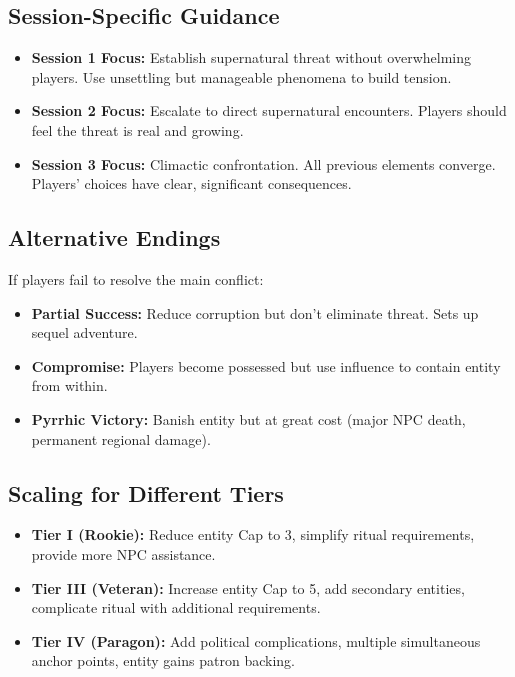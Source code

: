 \documentclass[11pt]{article}
\begin{document}
\subsection*{Session-Specific Guidance}
\begin{itemize}
    \item \textbf{Session 1 Focus:} Establish supernatural threat without overwhelming players. Use unsettling but manageable phenomena to build tension.
    \item \textbf{Session 2 Focus:} Escalate to direct supernatural encounters. Players should feel the threat is real and growing.
    \item \textbf{Session 3 Focus:} Climactic confrontation. All previous elements converge. Players' choices have clear, significant consequences.
\end{itemize}

\subsection*{Alternative Endings}
If players fail to resolve the main conflict:
\begin{itemize}
    \item \textbf{Partial Success:} Reduce corruption but don't eliminate threat. Sets up sequel adventure.
    \item \textbf{Compromise:} Players become possessed but use influence to contain entity from within.
    \item \textbf{Pyrrhic Victory:} Banish entity but at great cost (major NPC death, permanent regional damage).
\end{itemize}

\subsection*{Scaling for Different Tiers}
\begin{itemize}
    \item \textbf{Tier I (Rookie):} Reduce entity Cap to 3, simplify ritual requirements, provide more NPC assistance.
    \item \textbf{Tier III (Veteran):} Increase entity Cap to 5, add secondary entities, complicate ritual with additional requirements.
    \item \textbf{Tier IV (Paragon):} Add political complications, multiple simultaneous anchor points, entity gains patron backing.
\end{itemize}


\end{document}
